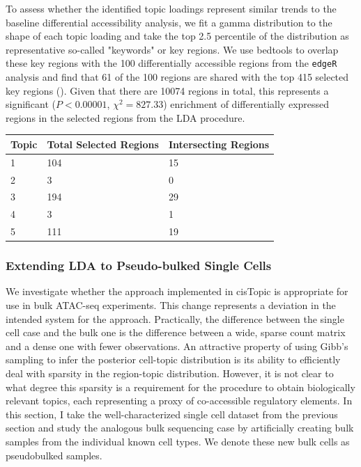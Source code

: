 To assess whether the identified topic loadings represent similar trends to the baseline differential accessibility analysis, we fit a gamma distribution to the shape of each topic loading and take the top 2.5 percentile of the distribution as representative so-called "keywords" or key regions. We use bedtools to overlap these key regions with the 100 differentially accessible regions from the {\tt edgeR} analysis and find that 61 of the 100 regions are shared with the top 415 selected key regions (). Given that there are 10074 regions in total, this represents a significant ($P<0.00001$, $\chi^2 = 827.33$) enrichment of differentially expressed regions in the selected regions from the LDA procedure.


\begin{table}
  \centering
  \begin{tabular}{l|l|l}
  Topic & Total Selected Regions & Intersecting Regions  \\ 
  \hline
  1     & 104                    & 15                    \\
  2     & 3                      & 0                     \\
  3     & 194                    & 29                    \\
  4     & 3                      & 1                     \\
  5     & 111                    & 19                   
  \end{tabular}
  \label{table:sc_t5_over}
  \end{table}

\subsubsection{Extending LDA to Pseudo-bulked Single Cells}

We investigate whether the approach implemented in cisTopic is appropriate for use in bulk ATAC-seq experiments. This change represents a deviation in the intended system for the approach. Practically, the difference between the single cell case and the bulk one is the difference between a wide, sparse count matrix and a dense one with fewer observations. An attractive property of using Gibb's sampling to infer the posterior cell-topic distribution is its ability to efficiently deal with sparsity in the region-topic distribution. However, it is not clear to what degree this sparsity is a requirement for the procedure to obtain biologically relevant topics, each representing a proxy of co-accessible regulatory elements. In this section, I take the well-characterized single cell dataset from the previous section and study the analogous bulk sequencing case by artificially creating bulk samples from the individual known cell types. We denote these new bulk cells as pseudobulked samples.


